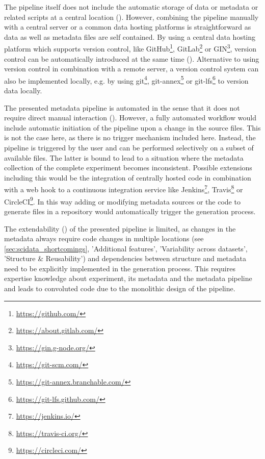 The pipeline itself does not include the automatic storage of data or metadata or related scripts at a central location (). However, combining the pipeline manually with a central server or a common data hosting platforms is straightforward as data as well as metadata files are self contained. By using a central data hosting platform which supports version control, like GitHub\footnote{\url{https://github.com/}}, GitLab\footnote{\url{https://about.gitlab.com/}} or GIN\footnote{\url{https://gin.g-node.org/}}, version control can be automatically introduced at the same time (). Alternative to using version control in combination with a remote server, a version control system can also be implemented locally, e.g. by using git\footnote{\url{https://git-scm.com/}}, git-annex\footnote{\url{https://git-annex.branchable.com/}} or git-lfs\footnote{\url{https://git-lfs.github.com/}} to version data locally.

The presented metadata pipeline is automated in the sense that it does not require direct manual interaction (). However, a fully automated workflow would include automatic initiation of the pipeline upon a change in the source files. This is not the case here, as there is no trigger mechanism included here. Instead, the pipeline is triggered by the user and can be performed selectively on a subset of available files. The latter is bound to lead to a situation where the metadata collection of the complete experiment becomes inconsistent. Possible extensions including this would be the integration of centrally hosted code in combination with a web hook to a continuous integration service like Jenkins\footnote{\url{https://jenkins.io/}}, Travis\footnote{\url{https://travis-ci.org/}} or CircleCI\footnote{\url{https://circleci.com/}}. In this way adding or modifying metadata sources or the code to generate  files in a repository would automatically trigger the  generation process.

The extendability () of the presented pipeline is limited, as changes in the metadata always require code changes in multiple locations (see \cref{sec:scidata_shortcomings}, 'Additional features', 'Variability across datasets', 'Structure \& Reusability') and dependencies between structure and metadata need to be explicitly implemented in the  generation process. This requires expertise knowledge about experiment, its metadata and the metadata pipeline and leads to convoluted code due to the monolithic design of the pipeline.

